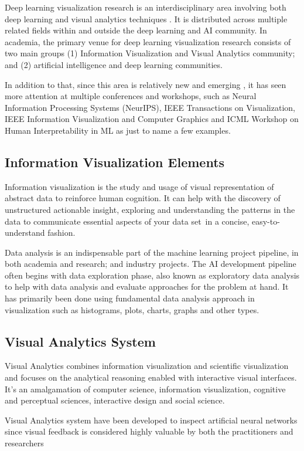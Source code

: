 Deep learning visualization research is an interdisciplinary area involving both deep learning and visual analytics techniques \cite{Choo2018}. It is distributed across multiple related fields within and outside the deep learning and AI community. In academia, the primary venue for deep learning visualization research consists of two main groups (1) Information Visualization and Visual Analytics community; and (2) artificial intelligence and deep learning communities. 

In addition to that, since this area is relatively new and emerging \cite{Choo2018}, it has seen more attention at multiple conferences and workshops, such as Neural Information Processing Systems (NeurIPS), IEEE Transactions on Visualization, IEEE Information Visualization and Computer Graphics and ICML Workshop on Human Interpretability in ML as just to name a few examples.

\subsection{Information Visualization Elements}

Information visualization is the study and usage of visual representation of abstract data to reinforce human cognition. It can help with the discovery of unstructured actionable insight, exploring and understanding the patterns in the data to communicate essential aspects of your data set in a concise, easy-to-understand fashion.

Data analysis is an indispensable part of the machine learning project pipeline, in both academia and research; and industry projects. The AI development pipeline often begins with data exploration phase, also known as exploratory data analysis to help with data analysis and evaluate approaches for the problem at hand. It has primarily been done using fundamental data analysis approach in visualization such as histograms, plots, charts, graphs and other types.

\subsection{Visual Analytics System}
    
Visual Analytics combines information visualization and scientific visualization and focuses on the analytical reasoning enabled with interactive visual interfaces. It’s an amalgamation of computer science, information visualization, cognitive and perceptual sciences, interactive design and social science.

Visual Analytics system have been developed to inspect artificial neural networks since visual feedback is considered highly valuable by both the practitioners and researchers


